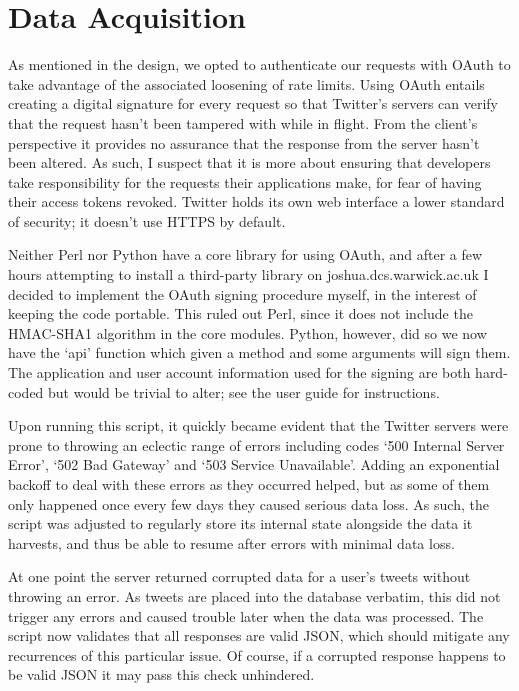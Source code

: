 \section{Data Acquisition}

As mentioned in the design, we opted to authenticate our requests with OAuth to take advantage of the associated loosening of rate limits. Using OAuth entails creating a digital signature for every request so that Twitter's servers can verify that the request hasn't been tampered with while in flight. From the client's perspective it provides no assurance that the response from the server hasn't been altered. As such, I suspect that it is more about ensuring that developers take responsibility for the requests their applications make, for fear of having their access tokens revoked. Twitter holds its own web interface a lower standard of security; it doesn't use HTTPS by default.

Neither Perl nor Python have a core library for using OAuth, and after a few hours attempting to install a third-party library on joshua.dcs.warwick.ac.uk I decided to implement the OAuth signing procedure myself, in the interest of keeping the code portable. This ruled out Perl, since it does not include the HMAC-SHA1 algorithm in the core modules. Python, however, did so we now have the `api' function which given a method and some arguments will sign them. The application and user account information used for the signing are both hard-coded but would be trivial to alter; see the user guide for instructions.

Upon running this script, it quickly became evident that the Twitter servers were prone to throwing an eclectic range of errors including codes `500 Internal Server Error', `502 Bad Gateway' and `503 Service Unavailable'. Adding an exponential backoff to deal with these errors as they occurred helped, but as some of them only happened once every few days they caused serious data loss. As such, the script was adjusted to regularly store its internal state alongside the data it harvests, and thus be able to resume after errors with minimal data loss.

At one point the server returned corrupted data for a user's tweets without throwing an error. As tweets are placed into the database verbatim, this did not trigger any errors and caused trouble later when the data was processed. The script now validates that all responses are valid JSON, which should mitigate any recurrences of this particular issue. Of course, if a corrupted response happens to be valid JSON it may pass this check unhindered.

